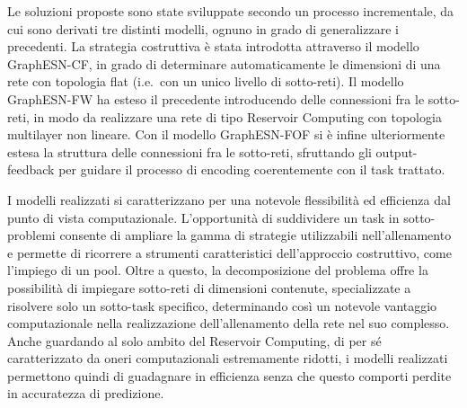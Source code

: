 Le soluzioni proposte sono state sviluppate secondo un processo incrementale, da cui sono derivati tre distinti modelli, ognuno in grado di generalizzare i precedenti. La strategia costruttiva è stata introdotta attraverso il modello GraphESN-CF, in grado di determinare automaticamente le dimensioni di una rete con topologia flat (i.e.\ con un unico livello di sotto-reti). Il modello GraphESN-FW ha esteso il precedente introducendo delle connessioni fra le sotto-reti, in modo da realizzare una rete di tipo Reservoir Computing con topologia multilayer non lineare. Con il modello GraphESN-FOF si è infine ulteriormente estesa la struttura delle connessioni fra le sotto-reti, sfruttando gli output-feedback per guidare il processo di encoding coerentemente con il task trattato.

I modelli realizzati si caratterizzano per una notevole flessibilità ed efficienza dal punto di vista computazionale. 
L'opportunità di suddividere un task in sotto-problemi consente di ampliare la gamma di strategie utilizzabili nell'allenamento e permette di ricorrere a strumenti caratteristici dell'approccio costruttivo, come l'impiego di un pool. Oltre a questo, la decomposizione del problema offre la possibilità di impiegare sotto-reti di dimensioni contenute, specializzate a risolvere solo un sotto-task specifico, determinando così un notevole vantaggio computazionale nella realizzazione dell'allenamento della rete nel suo complesso. Anche guardando al solo ambito del Reservoir Computing, di per sé caratterizzato da oneri computazionali estremamente ridotti, i modelli realizzati permettono quindi di guadagnare in efficienza senza che questo comporti perdite in accuratezza di predizione.

